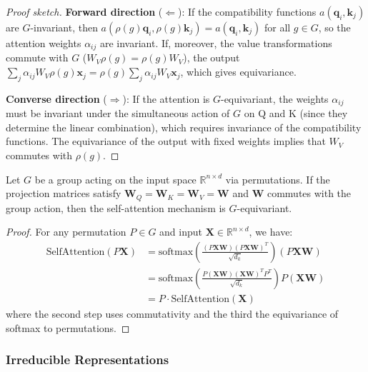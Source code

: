 \begin{proof}[Proof sketch]
\textbf{Forward direction} ($\Leftarrow$): If the compatibility functions $a(\mathbf{q}_i, \mathbf{k}_j)$ are $G$-invariant, then $a(\rho(g)\mathbf{q}_i, \rho(g)\mathbf{k}_j) = a(\mathbf{q}_i, \mathbf{k}_j)$ for all $g \in G$, so the attention weights $\alpha_{ij}$ are invariant. If, moreover, the value transformations commute with $G$ ($W_V \rho(g) = \rho(g) W_V$), the output $\sum_j \alpha_{ij} W_V \rho(g)\mathbf{x}_j = \rho(g) \sum_j \alpha_{ij} W_V \mathbf{x}_j$, which gives equivariance.

\textbf{Converse direction} ($\Rightarrow$): If the attention is $G$-equivariant, the weights $\alpha_{ij}$ must be invariant under the simultaneous action of $G$ on Q and K (since they determine the linear combination), which requires invariance of the compatibility functions. The equivariance of the output with fixed weights implies that $W_V$ commutes with $\rho(g)$.
\end{proof}

\begin{lemma}\label{lemma:self_attention_equivariance}
Let $G$ be a group acting on the input space $\mathbb{R}^{n \times d}$ via permutations.
If the projection matrices satisfy $\mathbf{W}_Q = \mathbf{W}_K = \mathbf{W}_V = \mathbf{W}$
and $\mathbf{W}$ commutes with the group action, then the self-attention mechanism
is $G$-equivariant.
\end{lemma}

\begin{proof}
For any permutation $P \in G$ and input $\mathbf{X} \in \mathbb{R}^{n \times d}$, we have:
\begin{align}
\text{SelfAttention}(P\mathbf{X}) &= \text{softmax}\left(\frac{(P\mathbf{X}\mathbf{W})(P\mathbf{X}\mathbf{W})^T}{\sqrt{d_k}}\right)(P\mathbf{X}\mathbf{W}) \\
&= \text{softmax}\left(\frac{P(\mathbf{X}\mathbf{W})(\mathbf{X}\mathbf{W})^T P^T}{\sqrt{d_k}}\right)P(\mathbf{X}\mathbf{W}) \\
&= P \cdot \text{SelfAttention}(\mathbf{X})
\end{align}
where the second step uses commutativity and the third the equivariance of softmax to permutations.
\end{proof}

\subsubsection{Irreducible Representations}


